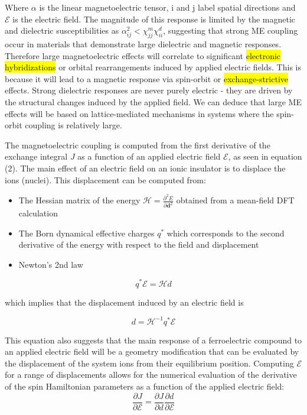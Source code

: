 \documentclass[10pt]{article}
\newcommand{\hilight}[1]{\colorbox{yellow}{#1}}
\begin{document}
Where $\alpha$ is the linear magnetoelectric tensor, i and j label spatial directions and $\mathcal{E}$ is the electric field. The magnitude of this response is limited by the magnetic and dielectric susceptibilities as $\alpha^2_{ij} < \chi^m_{jj}\chi^d_{ii}$, suggesting that strong ME coupling occur in materials that demonstrate large dielectric and magnetic responses. Therefore large magnetoelectric effects will correlate to significant \hilight{electronic hybridizations} or orbital rearrangements induced by applied electric fields. This is because it will lead to a magnetic response via spin-orbit or \hilight{exchange-strictive} effects. Strong dielectric responses are never purely electric - they are driven by the structural changes induced by the applied field. We can deduce that large ME effects will be based on lattice-mediated mechanisms in systems where the spin-orbit coupling is relatively large. 

The magnetoelectric coupling is computed from the first derivative of the exchange integral $J$ as a function of an applied electric field $\mathcal{E}$, as seen in equation (2). The main effect of an electric field on an ionic insulator is to displace the ions (nuclei). This displacement can be computed from:
\begin{itemize}
\item The Hessian matrix of the
energy $\mathcal{H} = \frac{\partial^2 E}{\partial \mathbf{d} ^2} $ obtained
from a mean-field DFT calculation
\item The Born dynamical effective charges $q^*$ which corresponds to the second
  derivative of the energy with respect to the field and displacement
\item Newton's 2nd law
\end{itemize}

$$ q^* \mathcal{E} = \mathcal{H} d $$

which implies that the displacement induced by an electric field is

$$ d = \mathcal{H}^{-1} q^* \mathcal{E} $$

This equation also suggests that the main response of a ferroelectric compound to an applied electric field will be a geometry modification that can be evaluated by the displacement of the system ions from their equilibrium position. Computing $\mathcal{E}$ for a range of displacements allows for the numerical evaluation of the derivative of the spin Hamiltonian parameters as a function of the applied electric field:
\begin{equation*}
	\dfrac{\partial J}{\partial \mathcal{E}} = \dfrac{\partial J}{\partial d}\dfrac{\partial d}{\partial \mathcal{E}}
\end{equation*}
\end{document}
